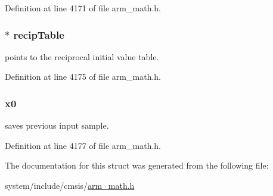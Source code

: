 Definition at line 4171 of file arm\+\_\+math.\+h.

\subsubsection[{\texorpdfstring{recip\+Table}{recipTable}}]{$\ast$ recip\+Table}\hypertarget{structarm__lms__norm__instance__q31_aec8a88dd688519b6b1e3c8d2e24bb775}{}\label{structarm__lms__norm__instance__q31_aec8a88dd688519b6b1e3c8d2e24bb775}
points to the reciprocal initial value table. 

Definition at line 4175 of file arm\+\_\+math.\+h.

\subsubsection[{\texorpdfstring{x0}{x0}}]{ x0}\hypertarget{structarm__lms__norm__instance__q31_a973b8350a0c7b113a5f002bc0b86bf76}{}\label{structarm__lms__norm__instance__q31_a973b8350a0c7b113a5f002bc0b86bf76}
saves previous input sample. 

Definition at line 4177 of file arm\+\_\+math.\+h.



The documentation for this struct was generated from the following file\+:\begin{DoxyCompactItemize}
\item 
system/include/cmsis/\hyperlink{arm__math_8h}{arm\+\_\+math.\+h}\end{DoxyCompactItemize}
